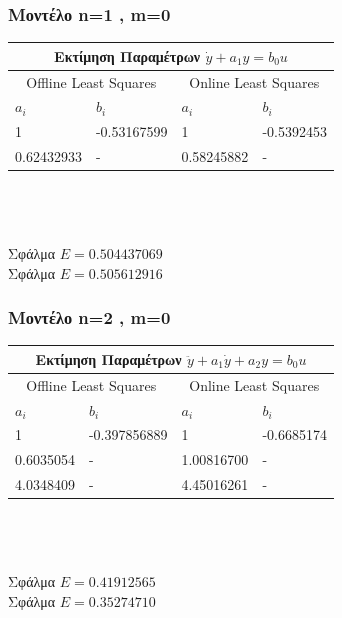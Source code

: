\documentclass[12pt]{article}
\begin{document}
\subsubsection{Μοντέλο n=1 , m=0}
\begin{tabular}{ |p{2.5cm}|p{2.5cm}||p{2.5cm}|p{2.5cm}| }
\hline
\multicolumn{4}{|c|}{ Εκτίμηση Παραμέτρων $\dot{y}+a_1 y= b_{0}u$}\\
\hline
\multicolumn{2}{|c||}{Offline Least Squares}&
\multicolumn{2}{|c|}{Online Least Squares }
\\
\hline
$ a_{i}$ & $b_i$ &$ a_{i}$ & $b_i$  \\
\hline
 1 & -0.53167599 & 1 & -0.5392453  \\
0.62432933  & - & 0.58245882 & -\\
\hline
\end{tabular}
\\ \\ \\
Σφάλμα $E= 0.504437069$\\
Σφάλμα $E= 0.505612916$
\subsubsection{Μοντέλο n=2 , m=0}
\begin{tabular}{ |p{2.5cm}|p{2.5cm}||p{2.5cm}|p{2.5cm}| }
\hline
\multicolumn{4}{|c|}{ Εκτίμηση Παραμέτρων $\ddot{y}+a_1\dot{y}+a_2 y= b_{0}u$}\\
\hline
\multicolumn{2}{|c||}{Offline Least Squares}&
\multicolumn{2}{|c|}{Online Least Squares }
\\
\hline
$ a_{i}$ & $b_i$ &$ a_{i}$ & $b_i$  \\
\hline
 1           & -0.397856889 &      1     &  -0.6685174 \\
0.6035054   &     -      & 1.00816700 &   -        \\
4.0348409   &     -      & 4.45016261   &   -        \\
\hline
\end{tabular}
\\ \\\\
Σφάλμα $E=0.41912565 $\\
Σφάλμα $E=0.35274710 $
\end{document}
